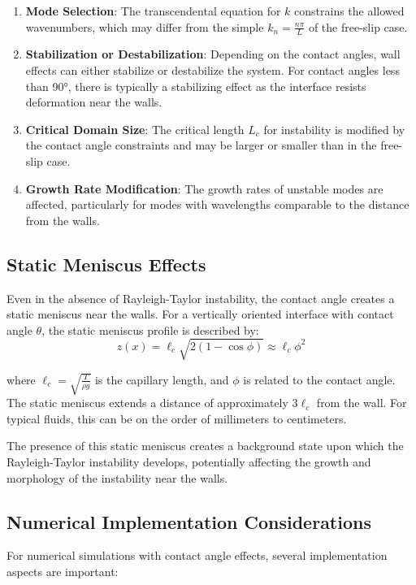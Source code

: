 \documentclass[12pt,a4paper]{article}
\begin{document}
\begin{enumerate}
    \item \textbf{Mode Selection}: The transcendental equation for $k$ constrains the allowed wavenumbers, which may differ from the simple $k_n = \frac{n\pi}{L}$ of the free-slip case.
    
    \item \textbf{Stabilization or Destabilization}: Depending on the contact angles, wall effects can either stabilize or destabilize the system. For contact angles less than 90°, there is typically a stabilizing effect as the interface resists deformation near the walls.
    
    \item \textbf{Critical Domain Size}: The critical length $L_c$ for instability is modified by the contact angle constraints and may be larger or smaller than in the free-slip case.
    
    \item \textbf{Growth Rate Modification}: The growth rates of unstable modes are affected, particularly for modes with wavelengths comparable to the distance from the walls.
\end{enumerate}

\subsection{Static Meniscus Effects}
Even in the absence of Rayleigh-Taylor instability, the contact angle creates a static meniscus near the walls. For a vertically oriented interface with contact angle $\theta$, the static meniscus profile is described by:
\begin{equation}
z(x) = \ell_c\sqrt{2(1-\cos\phi)} \approx \ell_c\phi^2
\end{equation}

where $\ell_c = \sqrt{\frac{T}{\rho g}}$ is the capillary length, and $\phi$ is related to the contact angle. The static meniscus extends a distance of approximately $3\ell_c$ from the wall. For typical fluids, this can be on the order of millimeters to centimeters.

The presence of this static meniscus creates a background state upon which the Rayleigh-Taylor instability develops, potentially affecting the growth and morphology of the instability near the walls.

\subsection{Numerical Implementation Considerations}
For numerical simulations with contact angle effects, several implementation aspects are important:
\end{document}
